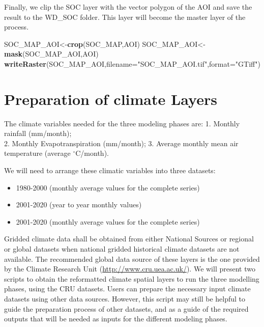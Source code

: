 \documentclass[
  10pt,
  b5paper,
]{book}
\newenvironment{Shaded}{\begin{snugshade}}{\end{snugshade}}
\newcommand{\DataTypeTok}[1]{\textcolor[rgb]{0.13,0.29,0.53}{#1}}
\newcommand{\KeywordTok}[1]{\textcolor[rgb]{0.13,0.29,0.53}{\textbf{#1}}}
\newcommand{\NormalTok}[1]{#1}
\newcommand{\StringTok}[1]{\textcolor[rgb]{0.31,0.60,0.02}{#1}}
\providecommand{\tightlist}{%
  \setlength{\itemsep}{0pt}\setlength{\parskip}{0pt}}
\begin{document}
Finally, we clip the SOC layer with the vector polygon of the AOI and save the result to the WD\_SOC folder. This layer will become the master layer of the process.

\begin{Shaded}
\begin{Highlighting}[]
\NormalTok{SOC_MAP_AOI<-}\KeywordTok{crop}\NormalTok{(SOC_MAP,AOI)}
\NormalTok{SOC_MAP_AOI<-}\KeywordTok{mask}\NormalTok{(SOC_MAP_AOI,AOI)}
\KeywordTok{writeRaster}\NormalTok{(SOC_MAP_AOI,}\DataTypeTok{filename=}\StringTok{"SOC_MAP_AOI.tif"}\NormalTok{,}\DataTypeTok{format=}\StringTok{"GTiff"}\NormalTok{)}
\end{Highlighting}
\end{Shaded}

\hypertarget{preparation-of-climate-layers}{%
\section{Preparation of climate Layers}\label{preparation-of-climate-layers}}

The climate variables needed for the three modeling phases are:
1. Monthly rainfall (mm/month);\\
2. Monthly Evapotranspiration (mm/month);
3. Average monthly mean air temperature (average \(^\circ\)C/month).

We will need to arrange these climatic variables into three datasets:

\begin{itemize}
\tightlist
\item
  1980-2000 (monthly average values for the complete series)
\item
  2001-2020 (year to year monthly values)
\item
  2001-2020 (monthly average values for the complete series)
\end{itemize}

Gridded climate data shall be obtained from either National Sources or regional or global datasets when national gridded historical climate datasets are not available. The recommended global data source of these layers is the one provided by the Climate Research Unit (\url{http://www.cru.uea.ac.uk/}).
We will present two scripts to obtain the reformatted climate spatial layers to run the three modelling phases, using the CRU datasets. Users can prepare the necessary input climate datasets using other data sources. However, this script may still be helpful to guide the preparation process of other datasets, and as a guide of the required outputs that will be needed as inputs for the different modeling phases.
\end{document}
